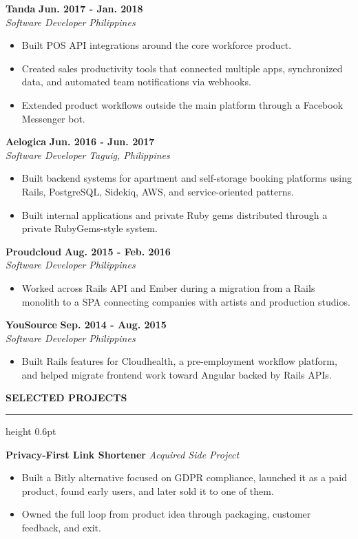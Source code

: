 \documentclass[10pt,letterpaper]{article}
\newcommand{\sectionheading}[1]{%
  \vspace{8pt}
  {\large\bfseries\MakeUppercase{#1}}\par
  \vspace{1pt}
  \hrule height 0.6pt
  \vspace{4pt}
}
\newcommand{\roleentry}[4]{%
  \Needspace{5\baselineskip}%
  \textbf{#1} \hfill \textbf{#2}\\
  \textit{#3} \hfill \textit{#4}\\[-2pt]
}
\newcommand{\projectentry}[2]{%
  \Needspace{3\baselineskip}%
  \textbf{#1} \hfill \textit{#2}\\[-2pt]
}
\begin{document}
\roleentry{Tanda}{Jun. 2017 - Jan. 2018}{Software Developer}{Philippines}
\begin{itemize}
  \item Built POS API integrations around the core workforce product.
  \item Created sales productivity tools that connected multiple apps, synchronized data, and automated team notifications via webhooks.
  \item Extended product workflows outside the main platform through a Facebook Messenger bot.
\end{itemize}

\roleentry{Aelogica}{Jun. 2016 - Jun. 2017}{Software Developer}{Taguig, Philippines}
\begin{itemize}
  \item Built backend systems for apartment and self-storage booking platforms using Rails, PostgreSQL, Sidekiq, AWS, and service-oriented patterns.
  \item Built internal applications and private Ruby gems distributed through a private RubyGems-style system.
\end{itemize}

\roleentry{Proudcloud}{Aug. 2015 - Feb. 2016}{Software Developer}{Philippines}
\begin{itemize}
  \item Worked across Rails API and Ember during a migration from a Rails monolith to a SPA connecting companies with artists and production studios.
\end{itemize}

\roleentry{YouSource}{Sep. 2014 - Aug. 2015}{Software Developer}{Philippines}
\begin{itemize}
  \item Built Rails features for Cloudhealth, a pre-employment workflow platform, and helped migrate frontend work toward Angular backed by Rails APIs.
\end{itemize}

\sectionheading{Selected Projects}
\projectentry{Privacy-First Link Shortener}{Acquired Side Project}
\begin{itemize}
  \item Built a Bitly alternative focused on GDPR compliance, launched it as a paid product, found early users, and later sold it to one of them.
  \item Owned the full loop from product idea through packaging, customer feedback, and exit.
\end{itemize}
\end{document}
